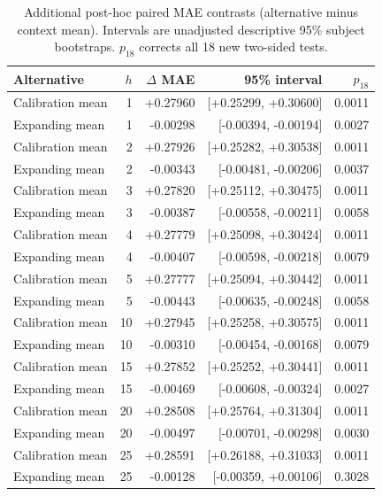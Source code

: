 \begin{table}[!ht]
\centering\small
\setlength{\tabcolsep}{5pt}
\caption{Additional post-hoc paired MAE contrasts (alternative minus context mean). Intervals are unadjusted descriptive 95\% subject bootstraps. $p_{18}$ corrects all 18 new two-sided tests.}
\label{tab:supp_additional_baseline_pairs}
\begin{tabular}{lrrrr}
\toprule
Alternative & $h$ & $\Delta$ MAE & 95\% interval & $p_{18}$ \\
\midrule
Calibration mean & 1 & +0.27960 & [+0.25299, +0.30600] & 0.0011 \\
Expanding mean & 1 & -0.00298 & [-0.00394, -0.00194] & 0.0027 \\
Calibration mean & 2 & +0.27926 & [+0.25282, +0.30538] & 0.0011 \\
Expanding mean & 2 & -0.00343 & [-0.00481, -0.00206] & 0.0037 \\
Calibration mean & 3 & +0.27820 & [+0.25112, +0.30475] & 0.0011 \\
Expanding mean & 3 & -0.00387 & [-0.00558, -0.00211] & 0.0058 \\
Calibration mean & 4 & +0.27779 & [+0.25098, +0.30424] & 0.0011 \\
Expanding mean & 4 & -0.00407 & [-0.00598, -0.00218] & 0.0079 \\
Calibration mean & 5 & +0.27777 & [+0.25094, +0.30442] & 0.0011 \\
Expanding mean & 5 & -0.00443 & [-0.00635, -0.00248] & 0.0058 \\
Calibration mean & 10 & +0.27945 & [+0.25258, +0.30575] & 0.0011 \\
Expanding mean & 10 & -0.00310 & [-0.00454, -0.00168] & 0.0079 \\
Calibration mean & 15 & +0.27852 & [+0.25252, +0.30441] & 0.0011 \\
Expanding mean & 15 & -0.00469 & [-0.00608, -0.00324] & 0.0027 \\
Calibration mean & 20 & +0.28508 & [+0.25764, +0.31304] & 0.0011 \\
Expanding mean & 20 & -0.00497 & [-0.00701, -0.00298] & 0.0030 \\
Calibration mean & 25 & +0.28591 & [+0.26188, +0.31033] & 0.0011 \\
Expanding mean & 25 & -0.00128 & [-0.00359, +0.00106] & 0.3028 \\
\bottomrule\end{tabular}\end{table}
